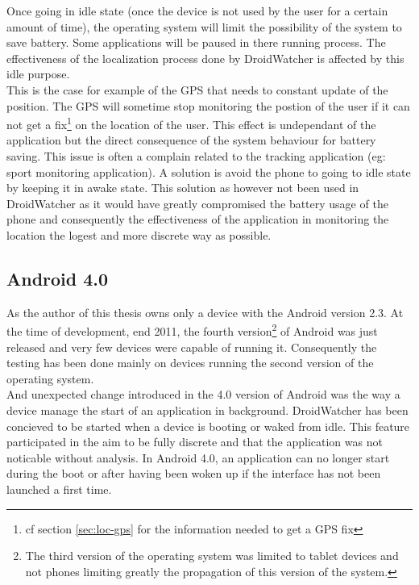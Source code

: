 Once going in idle state (once the device is not used by the user for a certain amount of time), the operating system will limit the possibility of the system to save battery.
Some applications will be paused in there running process.
The effectiveness of the localization process done by DroidWatcher is affected by this idle purpose.\\

This is the case for example of the GPS that needs to constant update of the position.
The GPS will sometime stop monitoring the postion of the user if it can not get a fix\footnote{cf section \ref{sec:loc-gps} for the information needed to get a GPS fix} on the location of the user.
This effect is undependant of the application but the direct consequence of the system behaviour for battery saving. 
This issue is often a complain related to the tracking application (eg: sport monitoring application).
A solution is avoid the phone to going to idle state by keeping it in awake state.
This solution as however not been used in DroidWatcher as it would have greatly compromised the battery usage of the phone and consequently the effectiveness of the application in monitoring the location the logest and more discrete way as possible.

\subsection{Android 4.0}

As the author of this thesis owns only a device with the Android version 2.3.
At the time of development, end 2011, the fourth version\footnote{The third version of the operating system was limited to tablet devices and not phones limiting greatly the propagation of this version of the system.} of Android was just released and very few devices were capable of running it.
Consequently the testing has been done mainly on devices running the second version of the operating system.\\

And unexpected change introduced in the 4.0 version of Android was the way a device manage the start of an application in background.
DroidWatcher has been concieved to be started when a device is booting or waked from idle.
This feature participated in the aim to be fully discrete and that the application was not noticable without analysis.
In Android 4.0, an application can no longer start during the boot or after having been woken up if the interface has not been launched a first time.\\

